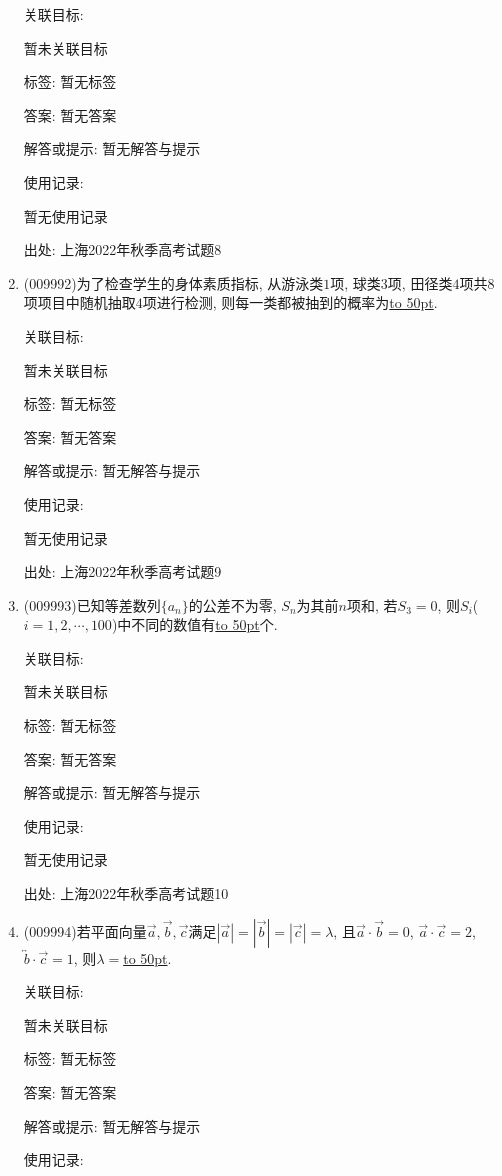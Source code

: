 \documentclass[10pt,a4paper]{article}
\newcommand{\blank}[1]{\underline{\hbox to #1pt{}}}
\begin{document}
\begin{enumerate}[1.]
关联目标:

暂未关联目标



标签: 暂无标签

答案: 暂无答案

解答或提示: 暂无解答与提示

使用记录:

暂无使用记录


出处: 上海2022年秋季高考试题8
\item { (009992)}为了检查学生的身体素质指标, 从游泳类$1$项, 球类$3$项, 田径类$4$项共$8$项项目中随机抽取$4$项进行检测, 则每一类都被抽到的概率为\blank{50}.


关联目标:

暂未关联目标



标签: 暂无标签

答案: 暂无答案

解答或提示: 暂无解答与提示

使用记录:

暂无使用记录


出处: 上海2022年秋季高考试题9
\item { (009993)}已知等差数列$\{a_n\}$的公差不为零, $S_n$为其前$n$项和, 若$S_3=0$, 则$S_i$($i=1,2,\cdots,100$)中不同的数值有\blank{50}个.


关联目标:

暂未关联目标



标签: 暂无标签

答案: 暂无答案

解答或提示: 暂无解答与提示

使用记录:

暂无使用记录


出处: 上海2022年秋季高考试题10
\item { (009994)}若平面向量$\overrightarrow a,\overrightarrow b,\overrightarrow c$满足$|\overrightarrow a|=|\overrightarrow b|=|\overrightarrow c|=\lambda$, 且$\overrightarrow a\cdot \overrightarrow b=0$, $\overrightarrow a\cdot \overrightarrow c=2$, $\overleftrightarrow b\cdot \overrightarrow c=1$, 则$\lambda=$\blank{50}.


关联目标:

暂未关联目标



标签: 暂无标签

答案: 暂无答案

解答或提示: 暂无解答与提示

使用记录:


\end{enumerate}
\end{document}
